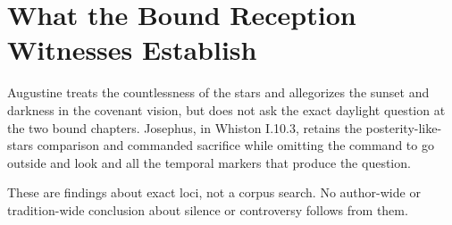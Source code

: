 \section{What the Bound Reception Witnesses Establish}

Augustine treats the countlessness of the stars and allegorizes the sunset and
darkness in the covenant vision, but does not ask the exact daylight question
at the two bound chapters. Josephus, in Whiston I.10.3, retains the
posterity-like-stars comparison and commanded sacrifice while omitting the
command to go outside and look and all the temporal markers that produce the
question.

These are findings about exact loci, not a corpus search. No author-wide or
tradition-wide conclusion about silence or controversy follows from them.

